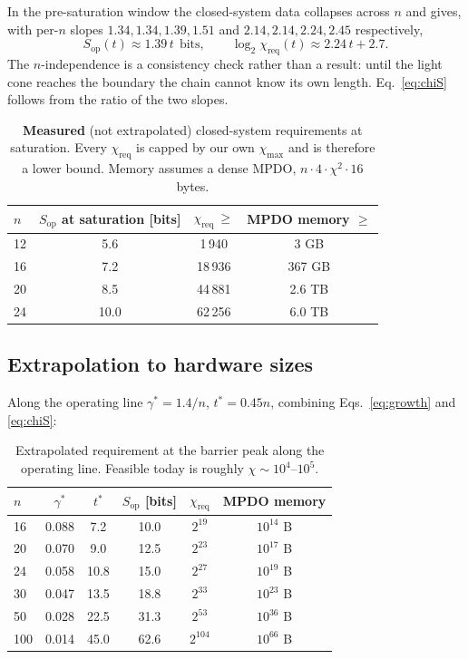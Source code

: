 \documentclass[11pt,a4paper]{article}
\newcommand{\Sop}{S_{\mathrm{op}}}
\newcommand{\chreq}{\chi_{\mathrm{req}}}
\begin{document}
In the pre-saturation window the closed-system data collapses across $n$ and
gives, with per-$n$ slopes $1.34,1.34,1.39,1.51$ and $2.14,2.14,2.24,2.45$
respectively,
\begin{equation}
  \Sop(t)\approx 1.39\,t\ \ \text{bits},
  \qquad
  \log_2\chreq(t)\approx 2.24\,t + 2.7 .
  \label{eq:growth}
\end{equation}
The $n$-independence is a consistency check rather than a result: until the
light cone reaches the boundary the chain cannot know its own length.
Eq.~\eqref{eq:chiS} follows from the ratio of the two slopes.

\begin{table}[htbp]
\centering
\caption{\textbf{Measured} (not extrapolated) closed-system requirements at
saturation. Every $\chreq$ is capped by our own $\chi_{\max}$ and is therefore a
lower bound. Memory assumes a dense MPDO, $n\cdot4\cdot\chi^2\cdot16$ bytes.}
\label{tab:measured}
\begin{tabular}{lccc}
\toprule
$n$ & $\Sop$ at saturation [bits] & $\chreq\ \ge$ & MPDO memory $\ge$ \\
\midrule
12 & 5.6 & 1\,940 & 3 GB \\
16 & 7.2 & 18\,936 & 367 GB \\
20 & 8.5 & 44\,881 & 2.6 TB \\
24 & 10.0 & 62\,256 & 6.0 TB \\
\bottomrule
\end{tabular}
\end{table}

\subsection{Extrapolation to hardware sizes}

Along the operating line $\gamma^\ast=1.4/n$, $t^\ast=0.45n$, combining
Eqs.~\eqref{eq:growth} and \eqref{eq:chiS}:

\begin{table}[htbp]
\centering
\caption{Extrapolated requirement at the barrier peak along the operating line.
Feasible today is roughly $\chi\sim10^4$--$10^5$.}
\label{tab:extrap}
\begin{tabular}{lccccc}
\toprule
$n$ & $\gamma^\ast$ & $t^\ast$ & $\Sop$ [bits] & $\chreq$ & MPDO memory \\
\midrule
16  & 0.088 & 7.2  & 10.0 & $2^{19}$  & $10^{14}$ B \\
20  & 0.070 & 9.0  & 12.5 & $2^{23}$  & $10^{17}$ B \\
24  & 0.058 & 10.8 & 15.0 & $2^{27}$  & $10^{19}$ B \\
30  & 0.047 & 13.5 & 18.8 & $2^{33}$  & $10^{23}$ B \\
50  & 0.028 & 22.5 & 31.3 & $2^{53}$  & $10^{36}$ B \\
100 & 0.014 & 45.0 & 62.6 & $2^{104}$ & $10^{66}$ B \\
\bottomrule
\end{tabular}
\end{table}
\end{document}
